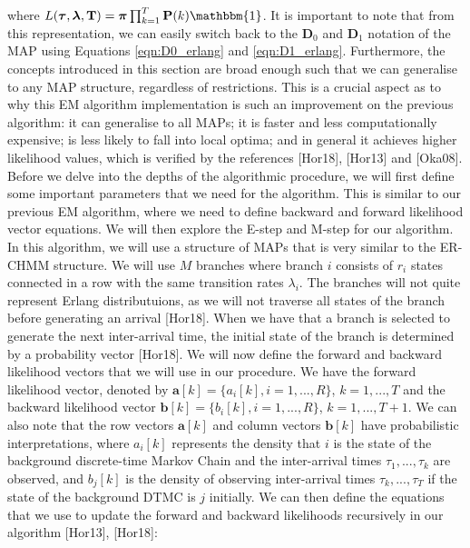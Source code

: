 \documentclass[a4paper,11pt,titlepage]{article}
\begin{document}
where $L(\bm{\tau}, \bm{\lambda}, \mathbf{T}) = \bm{\pi} \prod_{k=1}^T \mathbf{P}(k) \mathbbm{1}$. It is important to note that from this representation, we can easily switch back to the $\mathbf{D}_0$ and $\mathbf{D}_1$ notation of the MAP using Equations \ref{eqn:D0_erlang} and \ref{eqn:D1_erlang}. Furthermore, the concepts introduced in this section are broad enough such that we can generalise to any MAP structure, regardless of restrictions. This is a crucial aspect as to why this EM algorithm implementation is such an improvement on the previous algorithm: it can generalise to all MAPs; it is faster and less computationally expensive; is less likely to fall into local optima; and in general it achieves higher likelihood values, which is verified by the references [Hor18], [Hor13] and [Oka08]. Before we delve into the depths of the algorithmic procedure, we will first define some important parameters that we need for the algorithm. This is similar to our previous EM algorithm, where we need to define backward and forward likelihood vector equations. We will then explore the E-step and M-step for our algorithm. \\

In this algorithm, we will use a structure of MAPs that is very similar to the ER-CHMM structure. We will use $M$ branches where branch $i$ consists of $r_i$ states connected in a row with the same transition rates $\lambda_i$. The branches will not quite represent Erlang distributuions, as we will not traverse all states of the branch before generating an arrival [Hor18]. When we have that a branch is selected to generate the next inter-arrival time, the initial state of the branch is determined by a probability vector [Hor18]. We will now define the forward and backward likelihood vectors that we will use in our procedure. We have the forward likelihood vector, denoted by $\mathbf{a}[k] = \{a_i[k], i=1,...,R\}$, $k=1,...,T$ and the backward likelihood vector $\mathbf{b}[k] = \{b_i[k], i=1,...,R\}$, $k = 1,...,T+1$. We can also note that the row vectors $\mathbf{a}[k]$ and column vectors $\mathbf{b}[k]$ have probabilistic interpretations, where $a_i[k]$ represents the density that $i$ is the state of the background discrete-time Markov Chain and the inter-arrival times $\tau_1,...,\tau_k$ are observed, and $b_j[k]$ is the density of observing inter-arrival times $\tau_k,...,\tau_T$ if the state of the background DTMC is $j$ initially. We can then define the equations that we use to update the forward and backward likelihoods recursively in our algorithm [Hor13], [Hor18]:
\end{document}
